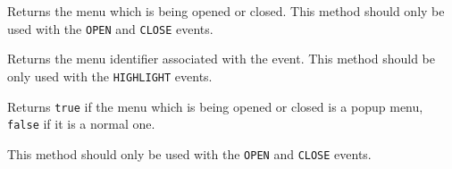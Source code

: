 \label{wxmenueventgetmenu}


Returns the menu which is being opened or closed. This method should only be
used with the \texttt{OPEN} and \texttt{CLOSE} events.


\label{wxmenueventgetmenuid}


Returns the menu identifier associated with the event. This method should be
only used with the {\tt HIGHLIGHT} events.


\label{wxmenueventispopup}


Returns {\tt true} if the menu which is being opened or closed is a popup menu, 
{\tt false} if it is a normal one.

This method should only be used with the {\tt OPEN} and {\tt CLOSE} events.


